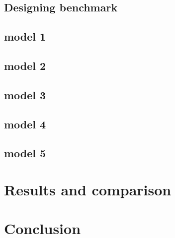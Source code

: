 \subsection{Designing benchmark}
\subsection{model 1}
\subsection{model 2}
\subsection{model 3}
\subsection{model 4}
\subsection{model 5}

\section{Results and comparison}

\section{Conclusion}






